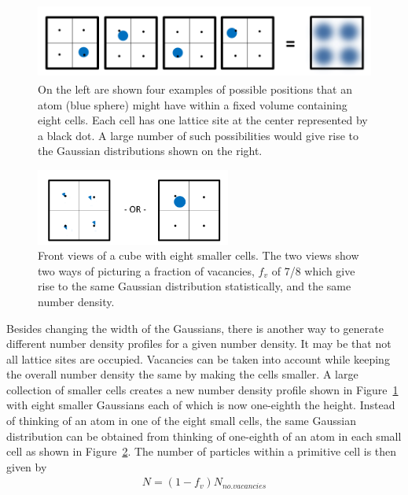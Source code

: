 \documentclass[double,12pt]{beavtex}
\begin{document}
\begin{figure}
   \centering
   \includegraphics[height=2.5cm]{Ensemble_Smallcells.png}
   \caption{On the left are shown four examples of possible positions 
   that an atom (blue sphere) might have within a fixed volume 
   containing eight cells. Each cell has one lattice site at the center 
   represented by a black dot. A large number of such possibilities 
   would give rise to the Gaussian distributions shown on the right.}
   \label{fig:Ensemble_Smallcells}
\end{figure} 

\begin{figure}
   \centering
   \includegraphics[height=2.5cm]{SameStatPic.png}
   \caption{Front views of a cube with eight smaller cells. The two views 
   show two ways of picturing a fraction of vacancies, $f_v$ of 7/8 which 
   give rise to the same Gaussian distribution statistically, 
   and the same number density.}
   \label{fig:SameStatPic}
\end{figure} 

Besides changing the width of the Gaussians, there is another way to 
generate different number density profiles for a given number density.
It may be that not all lattice sites are occupied. Vacancies can be taken 
into account while keeping the overall number density the same by 
making the cells smaller. A large collection of smaller cells creates a 
new number density profile shown in Figure~\ref{fig:Ensemble_Smallcells} 
with eight smaller Gaussians each of which is now one-eighth the height. 
Instead of thinking of an atom in one of the eight small cells, the same 
Gaussian distribution can be obtained from thinking of one-eighth of an 
atom in each small cell as shown in Figure~\ref{fig:SameStatPic}.  
The number of particles within a primitive cell is then given by  
\begin{align}
    N= (1-f_v){N_{no.vacancies}}
\end{align} 
\end{document}
